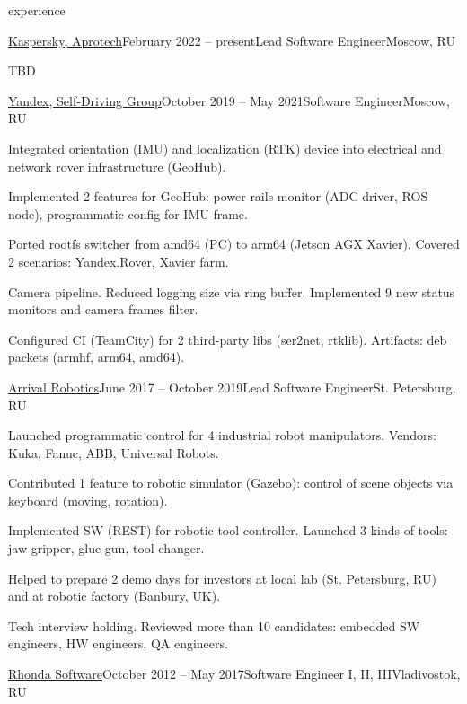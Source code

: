 \documentclass{template}
\begin{document}
\begin{rSection}{experience}
\begin{rCompany}{\href{https://www.aprotech.ru/}{Kaspersky, Aprotech}}{February 2022 -- present}{Lead Software Engineer}{Moscow, RU}

\item TBD

\end{rCompany}
\begin{rCompany}{\href{https://sdc.yandex.com/}{Yandex, Self-Driving Group}}{October 2019 -- May 2021}{Software Engineer}{Moscow, RU}

\item Integrated orientation (IMU) and localization (RTK) device into electrical and network rover infrastructure (GeoHub).
\item Implemented 2 features for GeoHub: power rails monitor (ADC driver, ROS node), programmatic config for IMU frame.
\item Ported rootfs switcher from amd64 (PC) to arm64 (Jetson AGX Xavier). Covered 2 scenarios: Yandex.Rover, Xavier farm.
\item Camera pipeline. Reduced logging size via ring buffer. Implemented 9 new status monitors and camera frames filter.
\item Configured CI (TeamCity) for 2 third-party libs (ser2net, rtklib). Artifacts: deb packets (armhf, arm64, amd64).

\end{rCompany}
\begin{rCompany}{\href{https://arrival.com/}{Arrival Robotics}}{June 2017 -- October 2019}{Lead Software Engineer}{St. Petersburg, RU}

\item Launched programmatic control for 4 industrial robot manipulators. Vendors: Kuka, Fanuc, ABB, Universal Robots.
\item Contributed 1 feature to robotic simulator (Gazebo): control of scene objects via keyboard (moving, rotation).
\item Implemented SW (REST) for robotic tool controller. Launched 3 kinds of tools: jaw gripper, glue gun, tool changer.
\item Helped to prepare 2 demo days for investors at local lab (St. Petersburg, RU) and at robotic factory (Banbury, UK).
\item Tech interview holding. Reviewed more than 10 candidates: embedded SW engineers, HW engineers, QA engineers.

\end{rCompany}
\begin{rCompany}{\href{http://www.rhondasoftware.com}{Rhonda Software}}{October 2012 -- May 2017}{Software Engineer I, II, III}{Vladivostok, RU}


\end{rCompany}
\end{rSection}
\end{document}
